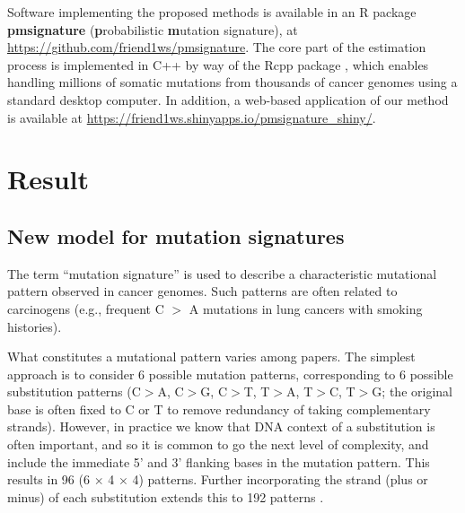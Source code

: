 \documentclass[10pt,letterpaper]{article}
\begin{document}

Software implementing the proposed methods is available in an R package 
{\bf pmsignature} ({\bf p}robabilistic {\bf m}utation signature),
at \url{https://github.com/friend1ws/pmsignature}.
The core part of the estimation process is implemented in C++ by way of the Rcpp package \cite{eddelbuettel2011rcpp},
which enables handling millions of somatic mutations from thousands of cancer genomes using a standard desktop computer.
In addition, a web-based application of our method is available at 
\url{https://friend1ws.shinyapps.io/pmsignature_shiny/}.


\section{Result}


\subsection*{New model for mutation signatures}

The term ``mutation signature'' is used to describe a characteristic mutational pattern observed in cancer genomes. Such patterns are often related to carcinogens (e.g., frequent C $>$ A mutations in lung cancers with smoking histories).

What constitutes a mutational pattern varies among papers.
The simplest approach is to consider 6 possible mutation patterns, corresponding to
6 possible substitution patterns (C$>$A, C$>$G, C$>$T, T$>$A, T$>$C, T$>$G; the original base is often fixed to C or T to remove redundancy of taking complementary strands).
However, in practice we know that DNA context of a substitution is often important, and so it is common to go the next level of complexity, and include the immediate 5' and 3' flanking bases in the mutation pattern.
This results in 96 (6 $\times$ 4 $\times$ 4) patterns. 
Further incorporating the strand (plus or minus) of each substitution extends this to 192 patterns \cite{pmid23945592, pmid23318258}. 
\end{document}

